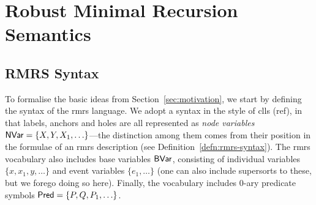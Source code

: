 \section{Robust Minimal Recursion Semantics}
\label{sec:rmrs}


\subsection{RMRS Syntax}

To formalise the basic ideas from Section~\ref{sec:motivation}, 
we start by defining the syntax of the {\sc rmrs} language.
We adopt a
syntax in the style of {\sc clls} (ref), in that labels, anchors and
holes are all represented as {\em node variables}
$\mathsf{NVar}=\{X,Y,X_1,\ldots\}$---the distinction among them comes
from their position in the formulae of an {\sc rmrs} description (see
Definition~\ref{defn:rmrs-syntax}). 
The {\sc rmrs} vocabulary also includes
base variables $\mathsf{BVar}$, consisting of
individual variables $\{x,x_1,y,\ldots\}$ and event variables
$\{e_1,\ldots\}$ (one can also include supersorts to
these, but we forego doing so here).  Finally, the vocabulary includes
0-ary predicate symbols $\mathsf{Pred}=\{P,Q,P_1,\ldots\}$.  

